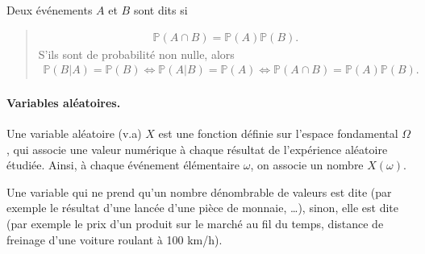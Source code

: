 \documentclass[letterpaper,11pt,english]{sphinxmanual}
\begin{document}
\begin{DUlineblock}{0em}
\item[] 
\item[] Deux événements \(A\) et \(B\) sont dits  si
\end{DUlineblock}
\begin{quote}
\begin{equation}\label{equation:chapter2:chapter2:38}
\begin{split}\mathbb{P}(A\cap B) = \mathbb{P}(A)\mathbb{P}(B).\end{split}
\end{equation}
\sphinxAtStartPar
S’ils sont de probabilité non nulle, alors
\begin{equation}\label{equation:chapter2:chapter2:39}
\begin{split}\mathbb{P}(B|A) = \mathbb{P}(B) \Leftrightarrow \mathbb{P}(A|B) = \mathbb{P}(A) \Leftrightarrow \mathbb{P}(A\cap B) = \mathbb{P}(A)\mathbb{P}(B).\end{split}
\end{equation}\end{quote}


\paragraph{Variables aléatoires.}
\label{\detokenize{chapter2:variables-aleatoires}}
\begin{DUlineblock}{0em}
\item[] 
\item[] Une variable aléatoire (v.a) \(X\) est une fonction définie sur
l’espace fondamental \(\Omega\), qui associe une valeur numérique
à chaque résultat de l’expérience aléatoire étudiée. Ainsi, à chaque
événement élémentaire \(\omega\), on associe un nombre
\(X(\omega)\).
\end{DUlineblock}

\sphinxAtStartPar
Une variable qui ne prend qu’un nombre dénombrable de valeurs est dite
 (par exemple le résultat d’une lancée d’une pièce de
monnaie, …), sinon, elle est dite  (par exemple le prix
d’un produit sur le marché au fil du temps, distance de freinage d’une
voiture roulant à 100 km/h).
\end{document}
